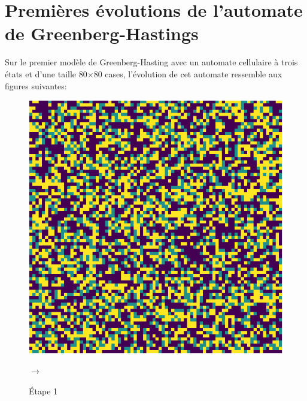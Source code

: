\documentclass[12pt, a4paper]{article}
\begin{document}
    
    \section{Premières évolutions de l'automate de Greenberg-Hastings}
        Sur le premier modèle de Greenberg-Hasting avec un automate cellulaire à trois états et d'une taille 80$\times$80 cases, l'évolution de cet automate ressemble aux figures suivantes:
        \begin{center}
            \begin{figure}[!h]
                \centering
                \begin{minipage}{.3\linewidth}
                    \centering
                    \includegraphics[scale=0.2]{img/step1.png}
                    \caption{Étape 1}
                \end{minipage}
                $\rightarrow$
                \begin{minipage}{.3\linewidth}
                    \centering

\end{minipage}
\end{figure}
\end{center}
\end{document}
